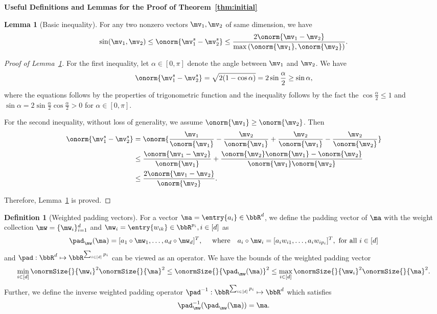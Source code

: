 \documentclass[lettersize,onecolumn,journal]{IEEEtran}
\theoremstyle{definition}
\newtheorem{lem}{Lemma}
\theoremstyle{definition}
\newtheorem{defn}{Definition}
\begin{document}
{\bf Useful Definitions and Lemmas for the Proof of Theorem~\ref{thm:initial}} 
\begin{lem}[Basic inequality]\label{lem:norm_diff} For any two nonzero vectors $\mv_1,\mv_2$ of same dimension, we have 
\[
\sin(\mv_1 , \mv_2) \leq \onorm{{\mv_1^s}-{\mv_2^s}}\leq {2\onorm{\mv_1-\mv_2}\over \max\left(\onorm{\mv_1},\onorm{\mv_2}\right)}.
\]
\end{lem}
\begin{proof}[Proof of Lemma~\ref{lem:norm_diff}]
For the first inequality, let $\alpha \in [0,\pi]$ denote the angle between $\mv_1$ and $\mv_2$. We have 
\begin{align}
     \onorm{{\mv_1^s}-{\mv_2^s}} = \sqrt{2(1 - \cos \alpha)} = 2 \sin \frac{\alpha}{2} \geq \sin \alpha,
\end{align}
where the equations follows by the properties of trigonometric function and the inequality follows by the fact the $\cos \frac{\alpha}{2} \leq 1$ and $\sin \alpha = 2 \sin \frac{\alpha}{2} \cos \frac{\alpha}{2} > 0$ for $\alpha \in [0, \pi]$. 

For the second inequality, without loss of generality, we assume $\onorm{\mv_1}\geq \onorm{\mv_2}$. Then
\begin{align}
\onorm{{\mv_1^s}-{\mv_2^s}}&=\onorm{{\mv_1\over \onorm{\mv_1}}- {\mv_2\over \onorm{\mv_1}}+{\mv_2\over \onorm{\mv_1}}-{\mv_2\over \onorm{\mv_2}}}\\
&\leq {\onorm{\mv_1-\mv_2}\over \onorm{\mv_1}}+{\onorm{\mv_2}\onorm{\mv_1}-\onorm{\mv_2}\over \onorm{\mv_1}\onorm{\mv_2}}\\
&\leq {2\onorm{\mv_1-\mv_2}\over \onorm{\mv_2}}.
\end{align}

Therefore, Lemma~\ref{lem:norm_diff} is proved.
\end{proof}


\begin{defn}[Weighted padding vectors]\label{def:pad} For a vector $\ma = \entry{a_i} \in \bbR^d$, we define the padding vector of $\ma$ with the weight collection $\mw = \{\mw_i\}_{i = 1}^d$ and $\mw_i = \entry{w_{ik}} \in \bbR^{p_i}, i \in [d]$ as
\begin{equation}
    \pad_{\mw}(\ma) = [a_1 \circ \mw_1, \ldots, a_d \circ \mw_d]^T, \quad \text{ where} \quad  a_i \circ \mw_i = [a_i w_{i1},\ldots, a_i w_{i p_i}]^T, \text{ for all } i \in [d]
\end{equation}
and $\pad: \bbR^{d}\mapsto \bbR^{\sum_{i\in[d]}p_i}$ can be viewed as an operator.
We have the bounds of the weighted padding vector
\begin{equation}\label{eq:pad_bound}
     \min_{i \in [d]} \onormSize{}{\mw_i}^2 \onormSize{}{\ma}^2 \leq \onormSize{}{\pad_{\mw}(\ma)}^2 \leq \max_{i \in [d]} \onormSize{}{\mw_i}^2 \onormSize{}{\ma}^2.
\end{equation}
Further, we define the inverse weighted padding operator $\pad^{-1}: \bbR^{\sum_{i\in[d]}p_i}\mapsto \bbR^d$ which satisfies 
\begin{equation}
    \pad^{-1}_{\mw}(\pad_{\mw}(\ma)) = \ma.
\end{equation}
\end{defn}
\end{document}
